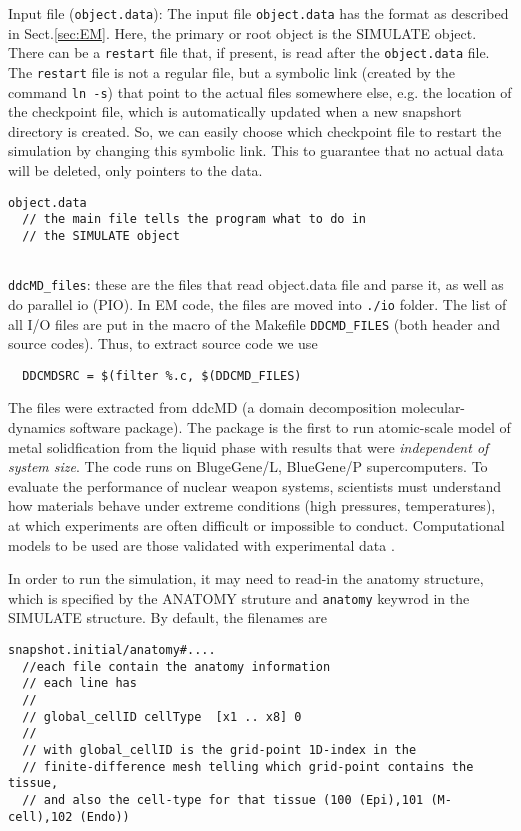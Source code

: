 Input file (\verb!object.data!): The input file \verb!object.data! has
  the format as described in Sect.\ref{sec:EM}. Here, the primary or root object
  is the SIMULATE object. There can be a \verb!restart! file that, if present,
  is read after the \verb!object.data! file. The \verb!restart! file is not a
  regular file, but a symbolic link (created by the command \verb!ln -s!) that
  point to the actual files somewhere else, e.g. the location of the checkpoint
  file, which is automatically updated when a new snapshort directory is
  created. So, we can easily choose which checkpoint file to restart the
  simulation by changing this symbolic link. This to guarantee that no actual
  data will be deleted, only pointers to the data.
\begin{verbatim}
object.data 
  // the main file tells the program what to do in 
  // the SIMULATE object 
  
\end{verbatim}

  \verb!ddcMD_files!: these are the files that read object.data file and
  parse it, as well as do parallel io (PIO). In EM code, the files are moved
  into \verb!./io! folder. The list of all I/O files are put in the macro of the
  Makefile \verb!DDCMD_FILES! (both header and source codes). Thus, to extract
  source code we use
  \begin{verbatim}
  DDCMDSRC = $(filter %.c, $(DDCMD_FILES)
  \end{verbatim}
  
  The files were extracted from ddcMD (a domain decomposition molecular-dynamics
  software package). The package is the first to run atomic-scale model of metal
  solidfication from the liquid phase with results that were {\it independent of
  system size}. The code runs on BlugeGene/L, BlueGene/P supercomputers. To
  evaluate the performance of nuclear weapon systems, scientists must understand
  how materials behave under extreme conditions (high pressures, temperatures),
  at which experiments are often difficult or impossible to conduct.
  Computational models to be used are those validated with experimental data
  \citep{streitz2006}.
  
In order to run the simulation, it may need to read-in the anatomy structure,
which is specified by the ANATOMY struture and \verb!anatomy! keywrod in the
SIMULATE structure. By default, the filenames are 

\begin{verbatim}
snapshot.initial/anatomy#....  
  //each file contain the anatomy information
  // each line has
  //
  // global_cellID cellType  [x1 .. x8] 0
  //
  // with global_cellID is the grid-point 1D-index in the
  // finite-difference mesh telling which grid-point contains the tissue, 
  // and also the cell-type for that tissue (100 (Epi),101 (M-cell),102 (Endo))
   
\end{verbatim}



